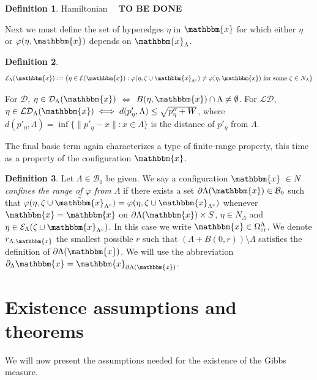 \documentclass[12pt,a4paper]{article}
\theoremstyle{definition}
\newtheorem{definition}{Definition}
\theoremstyle{remark}
\theoremstyle{theorem}
\newcommand{\tbd}{\textbf{{\color{red}~ TO BE DONE ~}}}
\newcommand{\x}{\mathbbm{x}}
\begin{document}
\begin{definition} Hamiltonian \tbd
\end{definition}

Next we must define the set of hyperedges $\eta$ in $\x$ for which either $\eta$ or $\varphi(\eta,\x)$ depends on $\x_\Lambda$.

\begin{definition} 
$$\mathcal E_\Lambda(\x) := \{ \eta \in \mathcal E(\x): \varphi(\eta,\zeta \cup \x_{\Lambda^c}) \neq \varphi(\eta,\x) \text{ for some } \zeta \in N_\Lambda \}$$
\end{definition}

For $\mathcal D$, $\eta \in \mathcal D_\Lambda(\x)$ $\iff$ $B(\eta,\x) \cap \Lambda \neq \emptyset$. \newline
For $\mathcal {LD}$, $\eta \in \mathcal {LD}_\Lambda(\x) \iff d(p'_\eta,\Lambda) \leq \sqrt{p''_\eta + W}$, where $d(p'_\eta,\Lambda) = \inf\{\|p'_\eta - x\|: x \in \Lambda\}$ is the distance of $p'_\eta$ from $\Lambda$.    \newline

The final basic term again characterizes a type of finite-range property, this time as a property of the configuration $\x$.

\begin{definition}
	Let $\Lambda \in \mathcal B_0$ be given. We say a configuration $\x\ \in N$ \textit{confines the range of $\varphi$ from $\Lambda$} if there exists a set $\partial \Lambda(\x) \in \mathcal B_0$ such that $\varphi(\eta,\zeta \cup \tilde{\x}_{\Lambda^c}) = \varphi(\eta,\zeta\cup\x_{\Lambda^c})$ whenever $\tilde{\x} = \x$ on $\partial \Lambda(\x)\times S$, $\eta \in N_\Lambda$ and $\eta \in \mathcal E_\Lambda(\zeta\cup\x_{\Lambda^c})$. In this case we write $\x \in \Omega^\Lambda_\text{cr}$. We denote $r_{\Lambda,\x}$ the smallest possible $r$ such that $(\Lambda + B(0,r))\setminus \Lambda$ satisfies the definition of $\partial \Lambda(\x)$. We will use the abbreviation $\partial_\Lambda \x = \x_{\partial \Lambda(\x)}$.
\end{definition}


\section{Existence assumptions and theorems}
We will now present the assumptions needed for the existence of the Gibbs measure.
\end{document}
